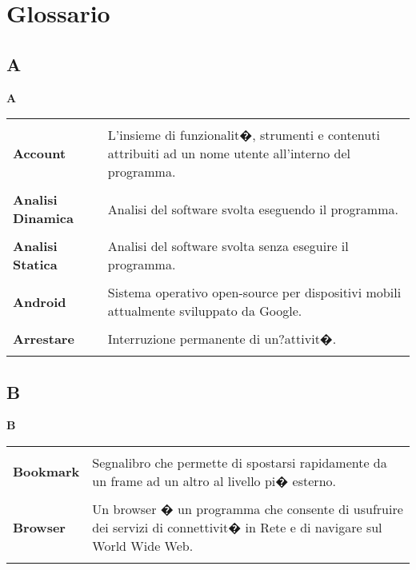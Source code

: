 \section{Glossario}{ 
\subsection{A} 
\hfill\Huge{\textbf{A}} \\ 
\normalsize 
\begin{longtabu} to 
\toprule \\ 
\textbf{Account} & L'insieme di funzionalit�, strumenti e contenuti attribuiti ad un nome utente all'interno del programma. \\ 
 \\ 
\textbf{Analisi Dinamica} & Analisi del software svolta eseguendo il programma. \\ 
 \\ 
\textbf{Analisi Statica} & Analisi del software svolta senza eseguire il programma. \\ 
 \\ 
\textbf{Android} & Sistema operativo open-source per dispositivi mobili attualmente sviluppato da Google. \\ 
 \\ 
\textbf{Arrestare} & Interruzione permanente di un?attivit�. \\ 
 \\ 
\end{longtabu} 
\newpage 
\subsection{B} 
\hfill\Huge{\textbf{B}} \\ 
\normalsize 
\begin{longtabu} to 
\toprule \\ 
\textbf{Bookmark} & Segnalibro che permette di spostarsi rapidamente da un frame ad un altro al livello pi� esterno. \\ 
 \\ 
\textbf{Browser} & Un browser � un programma che consente di usufruire dei servizi di connettivit� in Rete e di navigare sul World Wide Web. \\ 
 \\ 
\end{longtabu} 
\newpage 
}

